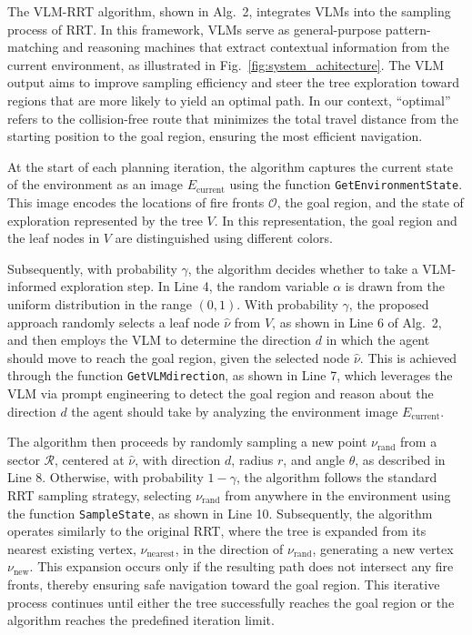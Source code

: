 The VLM-RRT algorithm, shown in Alg.~2, integrates VLMs into the sampling process of RRT. In this framework, VLMs serve as general-purpose pattern-matching and reasoning machines that extract contextual information from the current environment, as illustrated in Fig.~\ref{fig:system_achitecture}. The VLM output aims to improve sampling efficiency and steer the tree exploration toward regions that are more likely to yield an optimal path. In our context, ``optimal'' refers to the collision-free route that minimizes the total travel distance from the starting position to the goal region, ensuring the most efficient navigation.

At the start of each planning iteration, the algorithm captures the current state of the environment as an image \( E_{\text{current}} \) using the function \texttt{GetEnvironmentState}. This image encodes the locations of fire fronts \( \mathcal{O} \), the goal region, and the state of exploration represented by the tree \( V \). In this representation, the goal region and the leaf nodes in \( V \) are distinguished using different colors.

Subsequently, with probability \( \gamma \), the algorithm decides whether to take a VLM-informed exploration step. In Line 4, the random variable \( \alpha \) is drawn from the uniform distribution in the range \( (0,1) \). With probability \( \gamma \), the proposed approach randomly selects a leaf node \( \hat{\nu} \) from \( V \), as shown in Line 6 of Alg.~2, and then employs the VLM to determine the direction \( d \) in which the agent should move to reach the goal region, given the selected node \( \hat{\nu} \). This is achieved through the function \texttt{GetVLMdirection}, as shown in Line 7, which leverages the VLM via prompt engineering to detect the goal region and reason about the direction \( d \) the agent should take by analyzing the environment image \( E_{\text{current}} \).

The algorithm then proceeds by randomly sampling a new point \( \nu_{\text{rand}} \) from a sector \( \mathcal{R} \), centered at \( \hat{\nu} \), with direction \( d \), radius \( r \), and angle \( \theta \), as described in Line 8. Otherwise, with probability \( 1 - \gamma \), the algorithm follows the standard RRT sampling strategy, selecting \( \nu_{\text{rand}} \) from anywhere in the environment using the function \texttt{SampleState}, as shown in Line 10. Subsequently, the algorithm operates similarly to the original RRT, where the tree is expanded from its nearest existing vertex, \( \nu_{\text{nearest}} \), in the direction of \( \nu_{\text{rand}} \), generating a new vertex \( \nu_{\text{new}} \). This expansion occurs only if the resulting path does not intersect any fire fronts, thereby ensuring safe navigation toward the goal region. This iterative process continues until either the tree successfully reaches the goal region or the algorithm reaches the predefined iteration limit.




